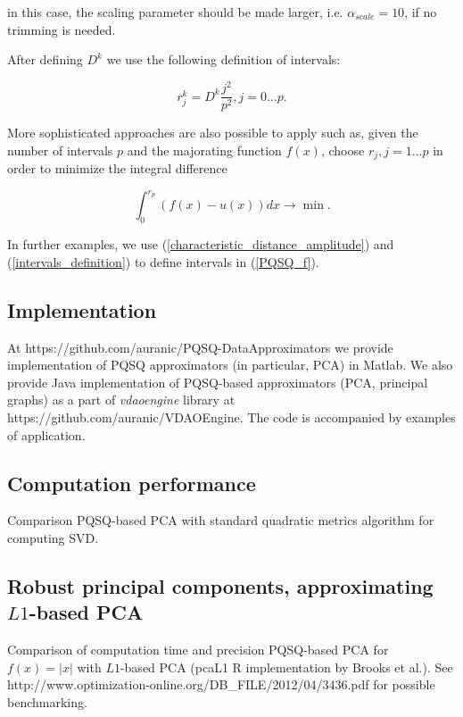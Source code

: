 \documentclass[preprint,12pt]{elsarticle}
\begin{document}
\noindent in this case, the scaling parameter should be made larger, i.e. $\alpha_{scale}=10$, if no trimming is needed.

After defining $D^k$ we use the following definition of intervals:

\begin{equation}\label{intervals_definition}
r_j^k = D^k\frac{j^2}{p^2}, j=0\dots p.
\end{equation}

More sophisticated approaches are also possible to apply such as, given the number of intervals $p$ and the majorating function $f(x)$, choose $r_j, j=1\dots p$ in order to minimize the integral difference

$$
\int_0^{r_p}(f(x)-u(x))dx \rightarrow \min.
$$

In further examples, we use (\ref{characteristic_distance_amplitude}) and (\ref{intervals_definition}) to define intervals in (\ref{PQSQ_f}).

\subsection{Implementation}

At https://github.com/auranic/PQSQ-DataApproximators we provide implementation of PQSQ approximators (in particular, PCA) in Matlab. We also provide Java implementation of PQSQ-based approximators (PCA, principal graphs) as a part of \emph{vdaoengine} library at https://github.com/auranic/VDAOEngine. The code is accompanied by examples of application.




\subsection{Computation performance}

Comparison PQSQ-based PCA with standard quadratic metrics algorithm for computing SVD.

\subsection{Robust principal components, approximating $L1$-based PCA}

Comparison of computation time and precision PQSQ-based PCA for $f(x)=|x|$ with $L1$-based PCA (pcaL1 R implementation by Brooks et al.). See
http://www.optimization-online.org/DB\_FILE/2012/04/3436.pdf for possible benchmarking.
\end{document}
